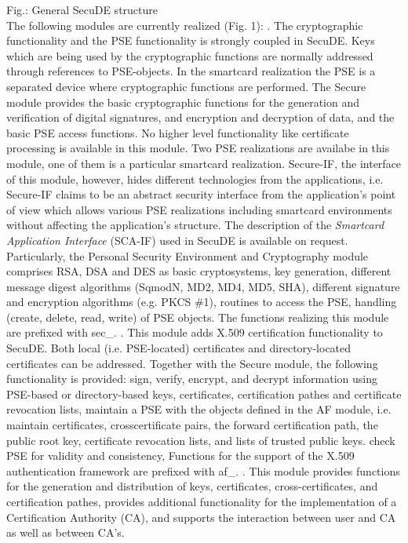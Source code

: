 
{\footnotesize Fig.:
General SecuDE structure}
\\ [1em]
The following modules are currently realized (Fig. 1):
\bi
{}. 
   The cryptographic functionality and the PSE functionality
   is strongly coupled in SecuDE. Keys which are being
   used by the cryptographic functions are normally addressed
   through references to PSE-objects. In the smartcard realization
   the PSE is a separated device where cryptographic functions
   are performed. The Secure module provides
   the basic cryptographic functions for the generation and 
   verification of digital signatures, and encryption and decryption 
   of data, and the basic PSE access functions. No higher level
   functionality like certificate processing is available in this module.
   Two PSE realizations are availabe in this module, one of them
   is a particular smartcard realization. Secure-IF, the interface of 
   this module, however, hides different technologies from
   the applications, i.e. Secure-IF claims to be an abstract security
   interface from the application's point of view which allows various
   PSE realizations including smartcard environments without affecting 
   the application's structure.
   The description of the {\em Smartcard Application Interface} (SCA-IF) 
   used in SecuDE is available on request.
   Particularly, the Personal Security Environment and Cryptography 
   module comprises
   \bi
   \m RSA, DSA and DES as basic cryptosystems,
   \m key generation,
   \m different message digest algorithms (SqmodN, MD2, MD4, MD5,
      SHA), 
   \m different signature and encryption algorithms (e.g. PKCS \#1),
   \m routines to access the PSE, handling (create, delete, read, write)
      of PSE objects.
   \ei
   The functions realizing this module are prefixed with sec\_.
. This module
   adds X.509 certification functionality to SecuDE.
   Both local (i.e. PSE-located) certificates and directory-located
   certificates can be addressed. Together with the Secure module, the
   following functionality is provided:
   \bi
   \m sign, verify, encrypt, and decrypt information using PSE-based or 
      directory-based keys, certificates, certification pathes and 
      certificate revocation lists,
   \m maintain a PSE with the objects defined in the AF 
      module, i.e. maintain certificates, crosscertificate pairs,
      the forward certification path, the public root key,
      certificate revocation lists, and lists of trusted public keys.
   \m check PSE for validity and consistency,
   \ei
   Functions for the support of the X.509 authentication framework are
   prefixed with af\_.
. 
   This module provides functions for the ge\-ne\-ra\-tion and distribution
   of keys, certificates,
   cross-certificates, and certification pathes, provides additional
   functionality for the 
   implementation of a Certification Authority (CA), and supports the
   interaction between user and CA
   as well as between CA's.

